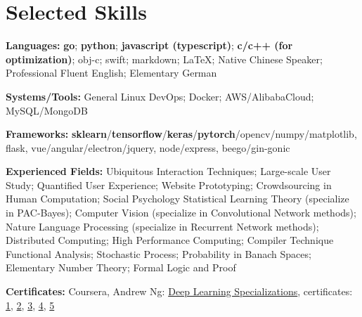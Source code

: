 \section{\textbf{Selected Skills}}
\resumeSubHeadingListStart
\item{
  \textbf{Languages:}{ \textbf{go}; \textbf{python}; \textbf{javascript (typescript)}; \textbf{c/c++ (for optimization)}; obj-c; swift; markdown; \LaTeX; Native Chinese Speaker; Professional Fluent English; Elementary German}
}
\item{
 \textbf{Systems/Tools:}{ General Linux DevOps; Docker; AWS/AlibabaCloud; MySQL/MongoDB}
}
\item{
 \textbf{Frameworks:}{ \textbf{sklearn}/\textbf{tensorflow}/\textbf{keras}/\textbf{pytorch}/opencv/numpy/matplotlib, flask, vue/angular/electron/jquery, node/express, beego/gin-gonic}
}
\item{
  \textbf{Experienced Fields:}{ 
    \resumeItemListStart
       { Ubiquitous Interaction Techniques; Large-scale User Study; Quantified User Experience; Website Prototyping; Crowdsourcing in Human Computation; Social Psychology}
       { Statistical Learning Theory (specialize in PAC-Bayes); Computer Vision (specialize in Convolutional Network methods); Nature Language Processing (specialize in Recurrent Network methods); Distributed Computing; High Performance Computing; Compiler Technique}
       { Functional Analysis; Stochastic Process; Probability in Banach Spaces; Elementary Number Theory; Formal Logic and Proof}
   \resumeItemListEnd
  }
}
\item{
 \textbf{Certificates:}{
  Coursera, Andrew Ng: \href{https://www.coursera.org/account/accomplishments/specialization/QGH8ZVJ6J2L2}{Deep Learning Specializations}, certificates:
  \href{https://www.coursera.org/account/accomplishments/verify/YH4NT7HHN263}{1}, 
  \href{https://www.coursera.org/account/accomplishments/verify/QGH3GNGF6BM4}{2}, 
  \href{https://www.coursera.org/account/accomplishments/verify/6VU45R2SZEF6}{3},
  \href{https://www.coursera.org/account/accomplishments/verify/LF3K9BQQDLVL}{4},
  \href{https://www.coursera.org/account/accomplishments/verify/JQFLW2DPYAGW}{5}
 }
}
\resumeSubHeadingListEnd